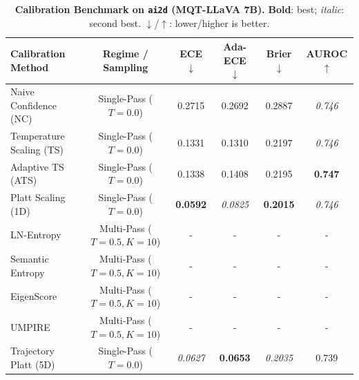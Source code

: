 \begin{table}[t]
\setlength{\tabcolsep}{4pt}
\renewcommand{\arraystretch}{1.05}
\centering
\footnotesize
\begin{tabular}{lccccc}
\toprule
\textbf{Calibration Method} & \textbf{Regime / Sampling} & \textbf{ECE} $\downarrow$ & \textbf{Ada-ECE} $\downarrow$ & \textbf{Brier} $\downarrow$ & \textbf{AUROC} $\uparrow$ \\
\midrule
Naive Confidence (NC) & Single-Pass ($T = 0.0$) & 0.2715 & 0.2692 & 0.2887 & \textit{0.746} \\
Temperature Scaling (TS) & Single-Pass ($T = 0.0$) & 0.1331 & 0.1310 & 0.2197 & \textit{0.746} \\
Adaptive TS (ATS) & Single-Pass ($T = 0.0$) & 0.1338 & 0.1408 & 0.2195 & \textbf{0.747} \\
Platt Scaling (1D) & Single-Pass ($T = 0.0$) & \textbf{0.0592} & \textit{0.0825} & \textbf{0.2015} & \textit{0.746} \\
LN-Entropy & Multi-Pass ($T = 0.5, K = 10$) & - & - & - & - \\
Semantic Entropy & Multi-Pass ($T = 0.5, K = 10$) & - & - & - & - \\
EigenScore & Multi-Pass ($T = 0.5, K = 10$) & - & - & - & - \\
UMPIRE & Multi-Pass ($T = 0.5, K = 10$) & - & - & - & - \\
Trajectory Platt (5D) & Single-Pass ($T = 0.0$) & \textit{0.0627} & \textbf{0.0653} & \textit{0.2035} & 0.739 \\
\bottomrule
\end{tabular}
\caption{\textbf{Calibration Benchmark on \texttt{ai2d} (MQT-LLaVA 7B).} \textbf{Bold}: best; \textit{italic}: second best. $\downarrow$/$\uparrow$: lower/higher is better.}
\label{tab:benchmark_mqt_ai2d}
\end{table}
